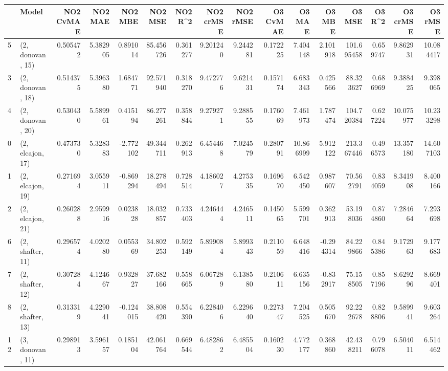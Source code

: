 \begin{tabular}{llrrrrrrrrrrrrrr}
\toprule
{} &             Model &  NO2 CvMAE &   NO2 MAE &   NO2 MBE &    NO2 MSE &   NO2 R\textasciicircum2 &  NO2 crMSE &  NO2 rMSE &  O3 CvMAE &     O3 MAE &    O3 MBE &      O3 MSE &    O3 R\textasciicircum2 &   O3 crMSE &    O3 rMSE \\
\midrule
5  &  (2, donovan, 15) &   0.505472 &  5.382905 &  0.891014 &  85.456726 &  0.361277 &   9.201240 &  9.244281 &  0.172225 &   7.404148 &  2.101918 &  101.695458 &  0.659747 &   9.862931 &  10.084417 \\
3  &  (2, donovan, 18) &   0.514375 &  5.396380 &  1.684771 &  92.571940 &  0.318270 &   9.472776 &  9.621431 &  0.157174 &   6.683343 &  0.425566 &   88.323627 &  0.686969 &   9.388425 &   9.398065 \\
4  &  (2, donovan, 20) &   0.530430 &  5.589961 &  0.415194 &  86.277261 &  0.358844 &   9.279271 &  9.288555 &  0.176069 &   7.461973 &  1.787474 &  104.720384 &  0.627224 &  10.075977 &  10.233298 \\
0  &  (2, elcajon, 17) &   0.473730 &  5.328383 & -2.772102 &  49.344711 &  0.262913 &   6.454468 &  7.024579 &  0.280791 &  10.866999 &  5.912122 &  213.367446 &  0.496573 &  13.357180 &  14.607103 \\
1  &  (2, elcajon, 19) &   0.271694 &  3.055911 & -0.869294 &  18.278494 &  0.728514 &   4.186027 &  4.275335 &  0.169670 &   6.542450 &  0.987607 &   70.562791 &  0.834059 &   8.341908 &   8.400166 \\
2  &  (2, elcajon, 21) &   0.260288 &  2.959916 &  0.023828 &  18.032857 &  0.733403 &   4.246444 &  4.246511 &  0.145065 &   5.599701 &  0.362913 &   53.198036 &  0.874860 &   7.284664 &   7.293698 \\
6  &  (2, shafter, 11) &   0.296574 &  4.020280 &  0.055369 &  34.802253 &  0.592149 &   5.899084 &  5.899343 &  0.211059 &   6.648416 & -0.294314 &   84.229866 &  0.845386 &   9.172963 &   9.177683 \\
7  &  (2, shafter, 12) &   0.307284 &  4.124667 &  0.932827 &  37.682166 &  0.558665 &   6.067289 &  6.138580 &  0.210611 &   6.635156 & -0.832917 &   75.158505 &  0.857196 &   8.629296 &   8.669401 \\
8  &  (2, shafter, 13) &   0.313319 &  4.229041 & -0.124015 &  38.808420 &  0.554390 &   6.228406 &  6.229640 &  0.227347 &   7.204525 &  0.505670 &   92.222678 &  0.828806 &   9.589941 &   9.603264 \\
12 &  (3, donovan, 11) &   0.298913 &  3.596157 &  0.185104 &  42.061764 &  0.669544 &   6.482862 &  6.485504 &  0.160230 &   4.772177 &  0.368860 &   42.438211 &  0.796078 &   6.504011 &   6.514462 \\

\end{tabular}
